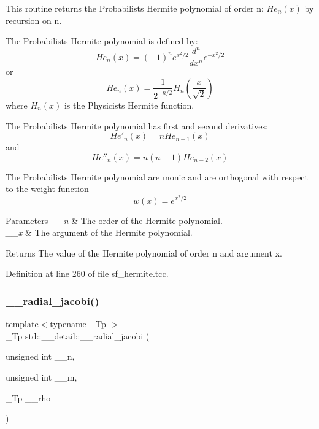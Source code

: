This routine returns the Probabilists Hermite polynomial of order n\+: $ He_n(x) $ by recursion on n. 

The Probabilists Hermite polynomial is defined by\+: \[ He_n(x) = (-1)^n e^{x^2/2} \frac{d^n}{dx^n} e^{-x^2/2} \] or \[ He_n(x) = \frac{1}{2^{-n/2}}H_n\left(\frac{x}{\sqrt{2}}\right) \] where $ H_n(x) $ is the Physicists Hermite function.

The Probabilists Hermite polynomial has first and second derivatives\+: \[ He'_n(x) = n He_{n-1}(x) \] and \[ He''_n(x) = n(n - 1) He_{n-2}(x) \]

The Probabilists Hermite polynomial are monic and are orthogonal with respect to the weight function \[ w(x) = e^{x^2/2} \]


\begin{DoxyParams}{Parameters}
{\em \+\_\+\+\_\+n} & The order of the Hermite polynomial. \\
\hline
{\em \+\_\+\+\_\+x} & The argument of the Hermite polynomial. \\
\hline
\end{DoxyParams}
\begin{DoxyReturn}{Returns}
The value of the Hermite polynomial of order n and argument x. 
\end{DoxyReturn}


Definition at line 260 of file sf\+\_\+hermite.\+tcc.

\mbox{\label{namespacestd_1_1____detail_a6d85c9848b491999fc80a1cdbd23db66}} 
\subsubsection{\texorpdfstring{\+\_\+\+\_\+radial\+\_\+jacobi()}{\_\_radial\_jacobi()}}
{\footnotesize\ttfamily template$<$typename \+\_\+\+Tp $>$ \\
\+\_\+\+Tp std\+::\+\_\+\+\_\+detail\+::\+\_\+\+\_\+radial\+\_\+jacobi (\begin{DoxyParamCaption}\item[{unsigned int}]{\+\_\+\+\_\+n,  }\item[{unsigned int}]{\+\_\+\+\_\+m,  }\item[{\+\_\+\+Tp}]{\+\_\+\+\_\+rho }\end{DoxyParamCaption})}

